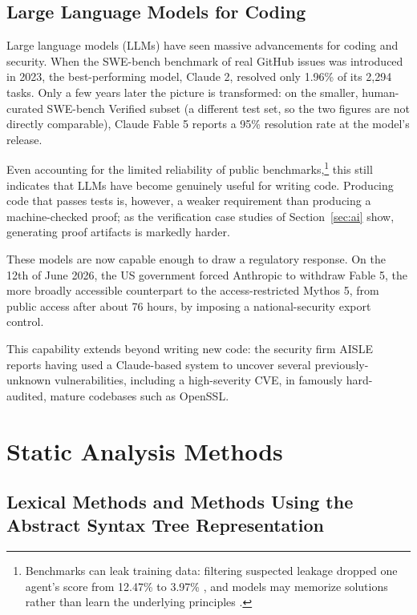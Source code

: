 \documentclass[conference]{IEEEtran}
\begin{document}
\subsection{Large Language Models for Coding}

Large language models (LLMs) have seen massive advancements for coding and security. When the SWE-bench benchmark of real GitHub issues was introduced in 2023, the best-performing model, Claude 2, resolved only 1.96\% of its 2{,}294 tasks. \cite{jimenez2024swebench} Only a few years later the picture is transformed: on the smaller, human-curated SWE-bench Verified subset (a different test set, so the two figures are not directly comparable), Claude Fable 5 reports a 95\% resolution rate at the model's release. \cite{anthropic_fable_mythos_card}

Even accounting for the limited reliability of public benchmarks,\footnote{Benchmarks can leak training data: filtering suspected leakage dropped one agent's score from 12.47\% to 3.97\% \cite{aleithan2024swebenchplus}, and models may memorize solutions rather than learn the underlying principles \cite{swebench_illusion}.} this still indicates that LLMs have become genuinely useful for writing code. Producing code that passes tests is, however, a weaker requirement than producing a machine-checked proof; as the verification case studies of Section~\ref{sec:ai} show, generating proof artifacts is markedly harder.

These models are now capable enough to draw a regulatory response. On the 12th of June 2026, the US government forced Anthropic to withdraw Fable 5, the more broadly accessible counterpart to the access-restricted Mythos 5, from public access after about 76 hours, by imposing a national-security export control. \cite{anthropic_fable_suspension}

This capability extends beyond writing new code: the security firm AISLE reports having used a Claude-based system to uncover several previously-unknown vulnerabilities, including a high-severity CVE, in famously hard-audited, mature codebases such as OpenSSL. \cite{aisle_openssl2026}

\section{Static Analysis Methods}

\subsection{Lexical Methods and Methods Using the Abstract Syntax Tree Representation}
\end{document}
